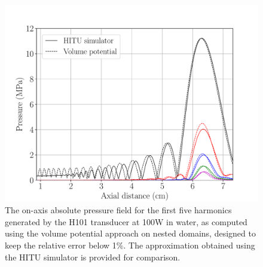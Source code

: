 \documentclass[11pt]{article}
\numberwithin{equation}{section}
\begin{document}
\begin{figure}[h!]
    \centering
    \includegraphics[width=\linewidth]{Figure11}
    \caption{The on-axis absolute pressure field for the first five harmonics generated 
    by the H101 transducer at 100W in water, as 
    computed using the volume potential approach on nested domains, designed to 
    keep the relative error below 1\%. The approximation obtained using the HITU
    simulator is provided for comparison.}
    \label{fig:HITU_comparison_H101_water}
\end{figure}  
\end{document}
